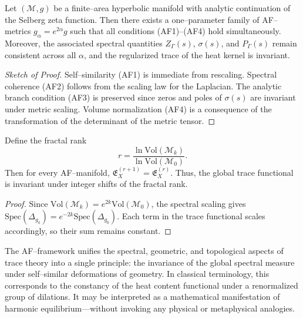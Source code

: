 \begin{theorem}
\label{thm:AF-existence}
Let \((\mathcal{M},g)\) be a finite–area hyperbolic manifold
with analytic continuation of the Selberg zeta function.
Then there exists a one–parameter family
of AF–metrics \(g_\alpha = e^{2\alpha}g\)
such that all conditions (AF1)–(AF4) hold simultaneously.
Moreover, the associated spectral quantities
\(Z_\Gamma(s)\), \(\sigma(s)\), and \(P_\Gamma(s)\)
remain consistent across all \(\alpha\),
and the regularized trace of the heat kernel is invariant.
\end{theorem}

\begin{proof}[Sketch of Proof]
Self–similarity (AF1) is immediate from rescaling.
Spectral coherence (AF2) follows from the scaling law
for the Laplacian.
The analytic branch condition (AF3)
is preserved since zeros and poles of \(\sigma(s)\)
are invariant under metric scaling.
Volume normalization (AF4)
is a consequence of the transformation of the determinant of the metric tensor.
\end{proof}


\begin{lemma}
\label{lem:fractal-rank}
Define the fractal rank
\[
r = \frac{\ln \mathrm{Vol}(\mathcal{M}_k)}{\ln \mathrm{Vol}(\mathcal{M}_0)}.
\]
Then for every AF–manifold,
\(\mathfrak{E}_X^{(r+1)} = \mathfrak{E}_X^{(r)}\).
Thus, the global trace functional is invariant under
integer shifts of the fractal rank.
\end{lemma}

\begin{proof}
Since \(\mathrm{Vol}(\mathcal{M}_k) = e^{2k}\mathrm{Vol}(\mathcal{M}_0)\),
the spectral scaling gives
\(\mathrm{Spec}(\Delta_{g_k}) = e^{-2k}\mathrm{Spec}(\Delta_{g_0})\).
Each term in the trace functional scales accordingly,
so their sum remains constant.
\end{proof}


\begin{remark}
The AF–framework unifies the spectral,
geometric, and topological aspects of trace theory
into a single principle:
the invariance of the global spectral measure
under self–similar deformations of geometry.
In classical terminology,
this corresponds to the constancy of the heat content functional
under a renormalized group of dilations.
It may be interpreted as a mathematical manifestation
of harmonic equilibrium—without invoking
any physical or metaphysical analogies.
\end{remark}

